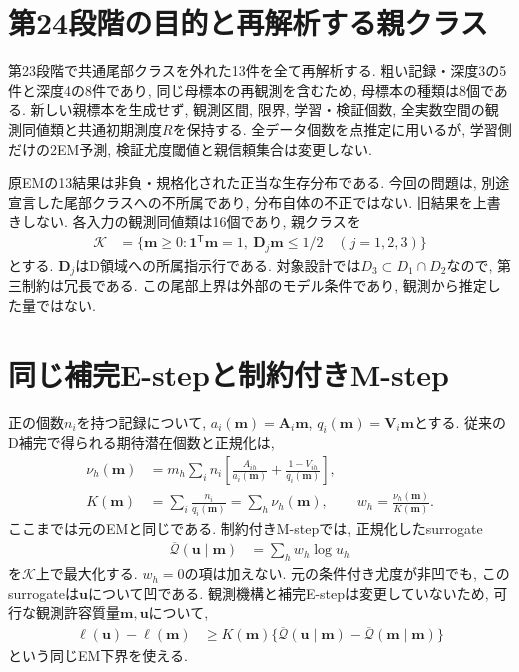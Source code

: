 
\section{第24段階の目的と再解析する親クラス}
\label{sec:stage24_scope}

第23段階で共通尾部クラスを外れた13件を全て再解析する.
粗い記録・深度3の5件と深度4の8件であり,
同じ母標本の再観測を含むため, 母標本の種類は8個である.
新しい親標本を生成せず, 観測区間, 限界, 学習・検証個数,
全実数空間の観測同値類と共通初期測度$R$を保持する.
全データ個数を点推定に用いるが,
学習側だけの2EM予測, 検証尤度閾値と親信頼集合は変更しない.

原EMの13結果は非負・規格化された正当な生存分布である.
今回の問題は, 別途宣言した尾部クラスへの不所属であり,
分布自体の不正ではない. 旧結果を上書きしない.
各入力の観測同値類は16個であり, 親クラスを
\begin{align}
\mathcal K
&=\{\bm m\ge0:\bm1^{\mathsf T}\bm m=1,
\ \bm D_j\bm m\le1/2\quad(j=1,2,3)\}
\label{eq:stage24_parent_class}
\end{align}
とする. $\bm D_j$はD領域への所属指示行である.
対象設計では$D_3\subset D_1\cap D_2$なので, 第三制約は冗長である.
この尾部上界は外部のモデル条件であり, 観測から推定した量ではない.

\section{同じ補完E-stepと制約付きM-step}
\label{sec:stage24_estep}

正の個数$n_i$を持つ記録について,
$a_i(\bm m)=\bm A_i\bm m$, $q_i(\bm m)=\bm V_i\bm m$とする.
従来のD補完で得られる期待潜在個数と正規化は,
\begin{align}
\nu_h(\bm m)
&=m_h\sum_i n_i\left[
\frac{A_{ih}}{a_i(\bm m)}+
\frac{1-V_{ih}}{q_i(\bm m)}\right],
\label{eq:stage24_expected_counts}\\
K(\bm m)&=\sum_i\frac{n_i}{q_i(\bm m)}
=\sum_h\nu_h(\bm m),\qquad
w_h=\frac{\nu_h(\bm m)}{K(\bm m)}.
\label{eq:stage24_normalization}
\end{align}
ここまでは元のEMと同じである.
制約付きM-stepでは, 正規化したsurrogate
\begin{align}
\overline{\mathcal Q}(\bm u\mid\bm m)
&=\sum_h w_h\log u_h
\label{eq:stage24_surrogate}
\end{align}
を$\mathcal K$上で最大化する.
$w_h=0$の項は加えない. 元の条件付き尤度が非凹でも,
このsurrogateは$\bm u$について凹である.
観測機構と補完E-stepは変更していないため,
可行な観測許容質量$\bm m,\bm u$について,
\begin{align}
\ell(\bm u)-\ell(\bm m)
&\ge K(\bm m)\{
\overline{\mathcal Q}(\bm u\mid\bm m)
-\overline{\mathcal Q}(\bm m\mid\bm m)\}
\label{eq:stage24_em_lower_bound}
\end{align}
という同じEM下界を使える.

